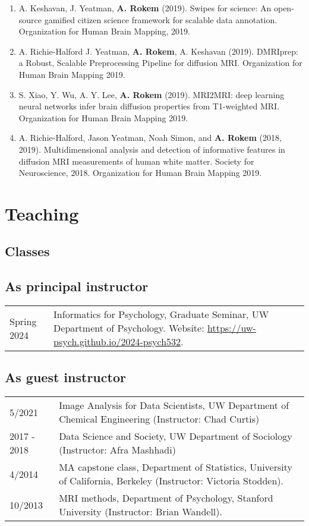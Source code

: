 \documentclass[11pt,fullpage]{article}
\begin{document}
\begin{enumerate}
\item A. Keshavan, J. Yeatman, {\bf A. Rokem} (2019). Swipes for science: An
open-source gamified citizen science framework for scalable data annotation.
Organization for Human Brain Mapping, 2019.

\item A. Richie-Halford J. Yeatman, {\bf A. Rokem}, A. Keshavan (2019).
DMRIprep: a Robust, Scalable Preprocessing Pipeline for diffusion MRI.
Organization for Human Brain Mapping 2019.

\item S. Xiao, Y. Wu, A. Y. Lee, {\bf A. Rokem} (2019). MRI2MRI: deep learning
neural networks infer brain diffusion properties from T1-weighted MRI. Organization for Human Brain Mapping 2019.

\item A. Richie-Halford, Jason Yeatman, Noah Simon, and {\bf A. Rokem} (2018, 2019). Multidimensional analysis and detection of informative features in diffusion MRI measurements of human white matter. Society for Neuroscience, 2018. Organization for Human Brain Mapping 2019.

\end{enumerate}

\section*{Teaching}

\subsection*{Classes}

\subsection*{As principal instructor}
\begin{tabular}{p{}p{}}
Spring 2024 & Informatics for Psychology, Graduate Seminar, UW Department of Psychology. Website: \url{https://uw-psych.github.io/2024-psych532}. \\
\end{tabular}
\subsection*{As guest instructor}
\begin{tabular}{p{}p{}}
5/2021 & Image Analysis for Data Scientists,  UW Department of Chemical Engineering (Instructor: Chad Curtis) \\
2017 - 2018 & Data Science and Society, UW Department of Sociology (Instructor: Afra Mashhadi) \\
4/2014 & MA capstone class, Department of Statistics, University of California, Berkeley (Instructor: Victoria Stodden).\\
10/2013 & MRI methods, Department of Psychology, Stanford University (Instructor: Brian Wandell).\\
\end{tabular}
\end{document}
